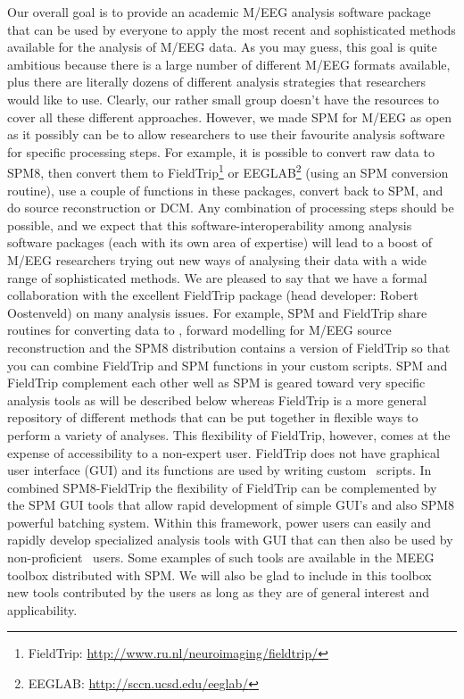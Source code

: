 Our overall goal is to provide an academic M/EEG analysis software package that can be used by everyone to apply the most recent and sophisticated methods available for the analysis of M/EEG data. As you may guess, this goal is quite ambitious because there is a large number of different M/EEG formats available, plus there are literally dozens of different analysis strategies that researchers would like to use. Clearly, our rather small group doesn't have the resources to cover all these different approaches. However, we made SPM for M/EEG as open as it possibly can be to allow researchers to use their favourite analysis software for specific processing steps. For example, it is possible to convert raw data to SPM8, then convert them to FieldTrip\footnote{FieldTrip: \url{http://www.ru.nl/neuroimaging/fieldtrip/}} or EEGLAB\footnote{EEGLAB: \url{http://sccn.ucsd.edu/eeglab/}} (using an SPM conversion routine), use a couple of functions in these packages, convert back to SPM, and do source reconstruction or DCM. Any combination of processing steps should be possible, and we expect that this software-interoperability among analysis software packages (each with its own area of expertise) will lead to a boost of M/EEG researchers trying out new ways of analysing their data with a wide range of sophisticated methods. We are pleased to say that we have a formal collaboration with the excellent FieldTrip package (head developer: Robert Oostenveld) on many analysis issues. For example, SPM and FieldTrip share routines for converting data to \matlab, forward modelling for M/EEG source reconstruction and the SPM8 distribution contains a version of FieldTrip so that you can combine FieldTrip and SPM functions in your custom scripts. SPM and FieldTrip complement each other well as SPM is geared toward very specific analysis tools as will be described below whereas FieldTrip is a more general repository of different methods that can be put together in flexible ways to perform a variety of analyses. This flexibility of FieldTrip, however, comes at the expense of accessibility to a non-expert user. FieldTrip does not have graphical user interface (GUI) and its functions are used by writing custom \matlab\ scripts. In combined SPM8-FieldTrip the flexibility of FieldTrip can be complemented by the SPM GUI tools that allow rapid development of simple GUI's and also SPM8 powerful batching system. Within this framework, power users can easily and rapidly develop specialized analysis tools with GUI that can then  also be used by non-proficient \matlab\ users. Some examples of such tools are available in the MEEG toolbox distributed with SPM. We will also be glad to include in this toolbox new tools contributed by the users as long as they are of general interest and applicability.
